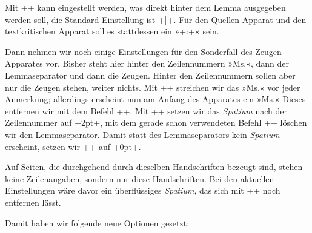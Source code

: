 Mit ++ kann eingestellt werden, was direkt hinter dem 
Lemma ausgegeben werden soll, die Standard-Einstellung ist +]+. Für den Quellen-Apparat 
und den textkritischen Apparat soll es stattdessen ein »+:+« sein.


Dann nehmen wir noch einige Einstellungen für den Sonderfall des Zeugen-Apparates vor. Bisher 
steht hier hinter den Zeilennummern »Ms.«, dann der Lemma\-sepa\-rator und dann die 
Zeugen. Hinter den Zeilennummern sollen aber nur die Zeugen stehen, weiter nichts. 
Mit ++ streichen wir das »Ms.« vor jeder Anmerkung; 
allerdings erscheint nun am Anfang des Apparates ein »Ms.« Dieses entfernen 
wir mit dem Befehl ++. Mit ++ 
setzen wir das \emph{Spatium} nach der Zeilennummer auf +2pt+, mit dem gerade 
schon verwendeten Befehl +\Xlemmaseparator+ löschen wir den Lemmaseparator. 
Damit statt des Lemmaseparators kein \emph{Spatium} erscheint, setzen wir 
++ auf +0pt+.

Auf Seiten, die durchgehend durch dieselben Handschriften bezeugt sind, stehen keine Zeilenangaben, sondern nur diese Handschriften. Bei den aktuellen Einstellungen wäre davor ein überflüssiges \emph{Spatium}, 
das sich mit ++ noch entfernen lässt.

Damit haben wir folgende neue Optionen gesetzt:

\begin{lfgwcode}{}
%
\Xnumberonlyfirstinline[][true]%
\Xnumberonlyfirstintwolines[][true]%
\Xsymlinenum{||}%
\Xnotenumfont[]{\bfseries}%
\Xnonbreakableafternumber[]%
%
\Xtwolinesbutnotmore%

\Xlemmaseparator[B,C]{:}

\setmsdatalabel{}%
\Xtxtbeforenotes[A]{}%
\Xafternumber[A]{2pt}%
\Xlemmaseparator[A]{}%
\Xinplaceoflemmaseparator[A]{0pt}%
\Xinplaceofnumber[A]{0pt}%
\end{lfgwcode}

